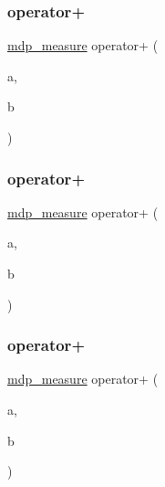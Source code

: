\mbox{\label{classmdp__measure_a1550c5a752f0e131323a0571cb75a1ed}} 
\subsubsection{\texorpdfstring{operator+}{operator+}\hspace{0.1cm}{\footnotesize\ttfamily [1/3]}}
{\footnotesize\ttfamily \hyperlink{classmdp__measure}{mdp\+\_\+measure} operator+ (\begin{DoxyParamCaption}\item[{\hyperlink{classmdp__measure}{mdp\+\_\+measure}}]{a,  }\item[{\hyperlink{classmdp__measure}{mdp\+\_\+measure}}]{b }\end{DoxyParamCaption})\hspace{0.3cm}{\ttfamily [friend]}}

\mbox{\label{classmdp__measure_a46628db42ccf7c2dd255a4babe524da2}} 
\subsubsection{\texorpdfstring{operator+}{operator+}\hspace{0.1cm}{\footnotesize\ttfamily [2/3]}}
{\footnotesize\ttfamily \hyperlink{classmdp__measure}{mdp\+\_\+measure} operator+ (\begin{DoxyParamCaption}\item[{float}]{a,  }\item[{\hyperlink{classmdp__measure}{mdp\+\_\+measure}}]{b }\end{DoxyParamCaption})\hspace{0.3cm}{\ttfamily [friend]}}

\mbox{\label{classmdp__measure_aa394587b2c7e09685b687bcc2b78f9ba}} 
\subsubsection{\texorpdfstring{operator+}{operator+}\hspace{0.1cm}{\footnotesize\ttfamily [3/3]}}
{\footnotesize\ttfamily \hyperlink{classmdp__measure}{mdp\+\_\+measure} operator+ (\begin{DoxyParamCaption}\item[{\hyperlink{classmdp__measure}{mdp\+\_\+measure}}]{a,  }\item[{float}]{b }\end{DoxyParamCaption})\hspace{0.3cm}{\ttfamily [friend]}}


